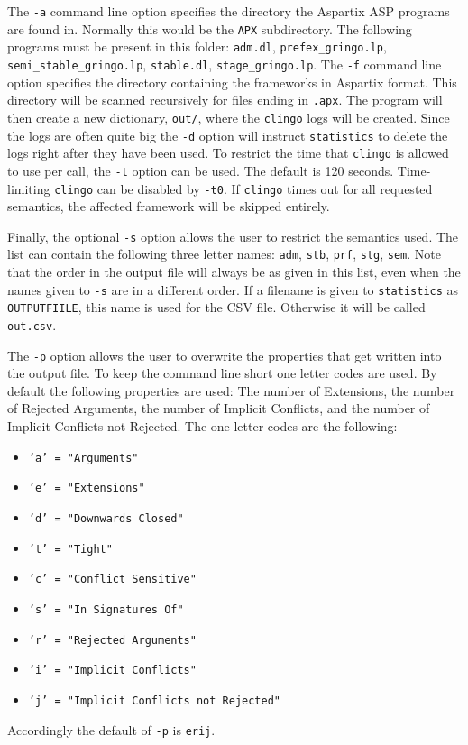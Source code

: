 \documentclass[parskip=half]{scrartcl}
\begin{document}
The \texttt{-a} command line option specifies the directory the Aspartix ASP
programs are found in. Normally this would be the \texttt{APX\/} subdirectory.
The following programs must be present in this folder: \texttt{adm.dl},
\texttt{prefex\_gringo.lp}, \texttt{semi\_stable\_gringo.lp},
\texttt{stable.dl}, \texttt{stage\_gringo.lp}.  The \texttt{-f} command line
option specifies the directory containing the frameworks in Aspartix format.
This directory will be scanned recursively for files ending
in \texttt{.apx}. The program will then create a new
dictionary, \texttt{out/}, where the \texttt{clingo} logs will be created.
Since the logs are often quite big the \texttt{-d} option will instruct
\texttt{statistics} to delete the logs right after they have been used.
To restrict the time that \texttt{clingo} is allowed to use per call, the
\texttt{-t} option can be used. The default is 120 seconds. Time-limiting
\texttt{clingo} can be disabled by \texttt{-t0}.
If \texttt{clingo} times out for all requested semantics, the affected
framework will be skipped entirely.

Finally, the optional \texttt{-s} option allows the user to restrict the
semantics used. The list can contain the following three letter names:
\texttt{adm}, \texttt{stb}, \texttt{prf}, \texttt{stg}, \texttt{sem}. Note that
the order in the output file will always be as given in this list, even when the
names given to \texttt{-s} are in a different order. If a filename is given to
\texttt{statistics} as \texttt{OUTPUTFIILE}, this name is used for the CSV file.
Otherwise it will be called \texttt{out.csv}.

The \texttt{-p} option allows the user to overwrite the properties that
get written into the output file. To keep the command line short one
letter codes are used.
By default the following properties are used: The number
of Extensions, the number of Rejected Arguments, the number of Implicit
Conflicts, and the number of Implicit Conflicts not Rejected.
The one letter codes are the following:
\begin{itemize}
	\item \texttt{'a' = "Arguments"}
	\item \texttt{'e' = "Extensions"}
	\item \texttt{'d' = "Downwards Closed"}
	\item \texttt{'t' = "Tight"}
	\item \texttt{'c' = "Conflict Sensitive"}
	\item \texttt{'s' = "In Signatures Of"}
	\item \texttt{'r' = "Rejected Arguments"}
	\item \texttt{'i' = "Implicit Conflicts"}
	\item \texttt{'j' = "Implicit Conflicts not Rejected"}
\end{itemize}
Accordingly the default of \texttt{-p} is \texttt{erij}.
\end{document}
